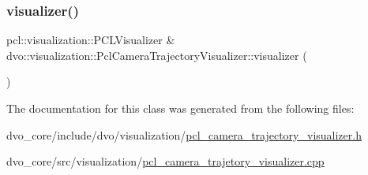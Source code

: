 \mbox{\label{classdvo_1_1visualization_1_1_pcl_camera_trajectory_visualizer_a29266bd96578573e145d97d2574abd78}} 
\subsubsection{\texorpdfstring{visualizer()}{visualizer()}}
{\footnotesize\ttfamily pcl\+::visualization\+::\+P\+C\+L\+Visualizer \& dvo\+::visualization\+::\+Pcl\+Camera\+Trajectory\+Visualizer\+::visualizer (\begin{DoxyParamCaption}{ }\end{DoxyParamCaption})}



The documentation for this class was generated from the following files\+:\begin{DoxyCompactItemize}
\item 
dvo\+\_\+core/include/dvo/visualization/\mbox{\hyperlink{pcl__camera__trajectory__visualizer_8h}{pcl\+\_\+camera\+\_\+trajectory\+\_\+visualizer.\+h}}\item 
dvo\+\_\+core/src/visualization/\mbox{\hyperlink{pcl__camera__trajetory__visualizer_8cpp}{pcl\+\_\+camera\+\_\+trajetory\+\_\+visualizer.\+cpp}}\end{DoxyCompactItemize}
